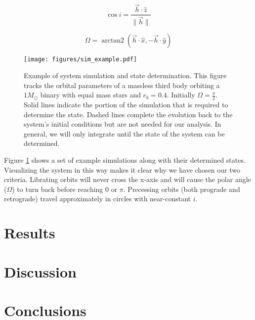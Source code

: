 \documentclass[twocolumn]{aastex631}
\DeclareMathOperator{\arctantwo}{arctan2}
\begin{document}
\begin{equation}
    \cos{i} = \frac{\vec{h} \cdot \hat{z}}{\|\vec{h}\|}
    \label{eq:inclination}
\end{equation}

\begin{equation}
    \Omega = \arctantwo (\vec{h} \cdot \hat{x}, -\vec{h} \cdot \hat{y})
    \label{eq:omega}
\end{equation}

\begin{figure}
    \begin{centering}
        \texttt{[image: figures/sim\_example.pdf]}
        \caption{Example of system simulation and state determination. This figure tracks the orbital parameters
        of a massless third body orbiting a $1 M_\odot$ binary with equal mass stars and $e_b = 0.4$.
        Initially $\Omega = \frac{\pi}{2}$.
        Solid lines indicate
        the portion of the simulation that is required to determine the state. Dashed lines complete the evolution back to the system's
        initial conditions but are not needed for our analysis. In general, we will only integrate until the state of the system can be
        determined.}
        \label{fig:sim_example}
    \end{centering}
\end{figure}

Figure \ref{fig:sim_example} shows a set of example simulations along with their determined states. Visualizing the 
system in this way makes it clear why we have chosen our two criteria. Librating orbits will never cross the x-axis
and will cause the polar angle ($\Omega$) to turn back before reaching $0$ or $\pi$. Precessing orbits (both prograde and retrograde)
travel approximately in circles with near-constant $i$.

\section{Results}
\label{sec:results}

\section{Discussion}
\label{sec:discussion}

\section{Conclusions}
\label{sec:conclusions}
\end{document}
